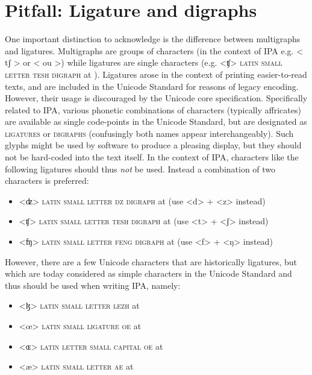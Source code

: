   
\section{Pitfall: Ligature and digraphs}
\label{pitfall-ligatures-digraphs}     
       
One important distinction to acknowledge is the difference between multigraphs
and ligatures. Multigraphs are groups of characters (in the context of IPA e.g.
< tʃ > or < ou >) while ligatures are single characters (e.g. <ʧ> \textsc{latin
small letter tesh digraph} at ). Ligatures arose in the context of
printing easier-to-read texts, and are included in the Unicode Standard for
reasons of legacy encoding. However, their usage is discouraged by the Unicode
core specification. Specifically related to IPA, various phonetic combinations
of characters (typically affricates) are available as single code-points in the
Unicode Standard, but are designated as \textsc{ligatures} or \textsc{digraphs}
(confusingly both names appear interchangeably). Such glyphs might be used by
software to produce a pleasing display, but they should not be hard-coded into
the text itself. In the context of IPA, characters like the following ligatures
should thus \emph{not} be used. Instead a combination of two characters is
preferred:
      
\begin{itemize} 
	\item <ʣ> \textsc{latin small letter dz digraph} at  (use <d> + <z> instead) 
	\item <ʧ> \textsc{latin small letter tesh digraph} at  (use <t> + <ʃ> instead) 
	\item <ʩ> \textsc{latin small letter feng digraph} at  (use <f> + <ŋ> instead) 
\end{itemize}

However, there are a few Unicode characters that are historically ligatures, but
which are today considered as simple characters in the Unicode Standard and thus
should be used when writing IPA, namely:

\begin{itemize}
	\item <ɮ> \textsc{latin small letter lezh} at  
	\item <œ> \textsc{latin small ligature oe} at  
	\item <ɶ> \textsc{latin letter small capital oe} at  
	\item <æ> \textsc{latin small letter ae} at  
\end{itemize}

